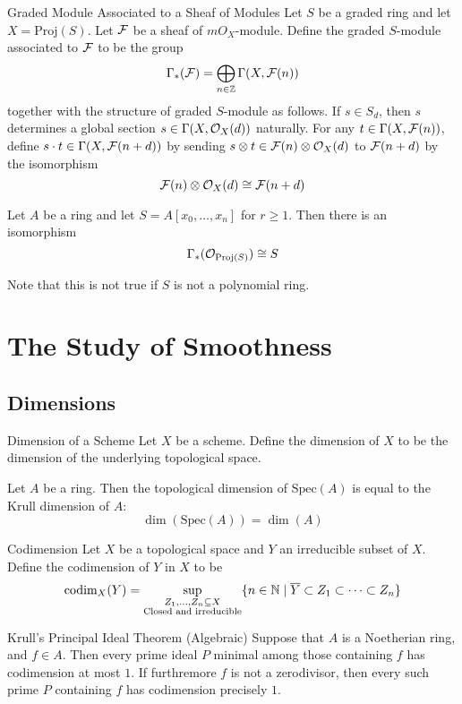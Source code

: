 \documentclass[a4paper]{article}
\begin{document}
\begin{defn}{Graded Module Associated to a Sheaf of Modules}{} Let $S$ be a graded ring and let $X=\text{Proj}(S)$. Let $\mathcal{F}$ be a sheaf of $mO_X$-module. Define the graded $S$-module associated to $\mathcal{F}$ to be the group $$\Gamma_\ast(\mathcal{F})=\bigoplus_{n\in\mathbb{Z}}\Gamma(X,\mathcal{F}(n))$$ together with the structure of graded $S$-module as follows. If $s\in S_d$, then $s$ determines a global section $s\in\Gamma(X,\mathcal{O}_X(d))$ naturally. For any $t\in\Gamma(X,\mathcal{F}(n))$, define $s\cdot t\in\Gamma(X,\mathcal{F}(n+d))$ by sending $s\otimes t\in\mathcal{F}(n)\otimes\mathcal{O}_X(d)$ to $\mathcal{F}(n+d)$ by the isomorphism $$\mathcal{F}(n)\otimes\mathcal{O}_X(d)\cong\mathcal{F}(n+d)$$
\end{defn}

\begin{prp}{}{} Let $A$ be a ring and let $S=A[x_0,\dots,x_n]$ for $r\geq 1$. Then there is an isomorphism $$\Gamma_\ast(\mathcal{O}_{\text{Proj}(S)})\cong S$$
\end{prp}

Note that this is not true if $S$ is not a polynomial ring. 

\pagebreak
\section{The Study of Smoothness}
\subsection{Dimensions}
\begin{defn}{Dimension of a Scheme}{} Let $X$ be a scheme. Define the dimension of $X$ to be the dimension of the underlying topological space. 
\end{defn}

\begin{prp}{}{} Let $A$ be a ring. Then the topological dimension of $\text{Spec}(A)$ is equal to the Krull dimension of $A$: $$\dim(\text{Spec}(A))=\dim(A)$$
\end{prp}

\begin{defn}{Codimension}{} Let $X$ be a topological space and $Y$ an irreducible subset of $X$. Define the codimension of $Y$ in $X$ to be $$\text{codim}_X(Y)=\sup_{\substack{Z_1,\dots,Z_n\subseteq X\\\text{Closed and irreducible}}}\{n\in\mathbb{N}\;|\;\overline{Y}\subset Z_1\subset\dots\subset Z_n\}$$
\end{defn}

\begin{thm}{Krull's Principal Ideal Theorem (Algebraic)}{} Suppose that $A$ is a Noetherian ring, and $f\in A$. Then every prime ideal $P$ minimal among those containing $f$ has codimension at most $1$. If furthremore $f$ is not a zerodivisor, then every such prime $P$ containing $f$ has codimension precisely $1$. 
\end{thm}
\end{document}
